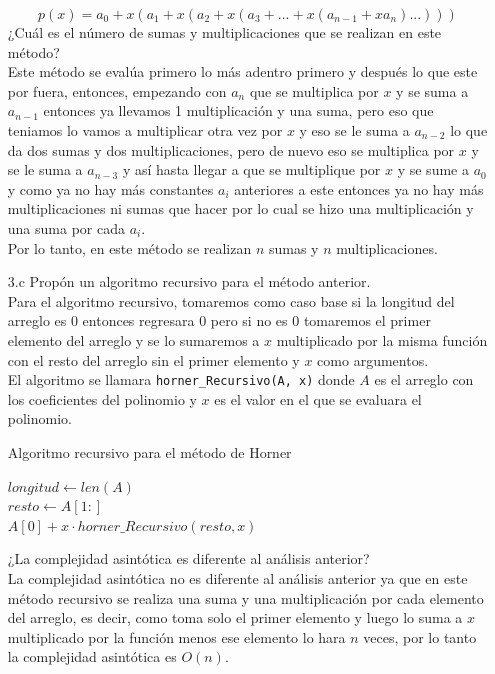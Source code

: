 \documentclass[12pt]{article}
\begin{document}
\begin{itemize}
    \[
        p(x) = a_0 + x(a_1 + x(a_2 + x(a_3 + . . . + x(a_{n-1} + xa_n). . .)))
    \]
    ¿Cuál es el número de sumas y multiplicaciones que se realizan en este método?\\
    Este método se evalúa primero lo más adentro primero y después lo que este por fuera, entonces, empezando con $a_n$ que se multiplica por $x$ y se suma a $a_{n-1}$ entonces ya llevamos 1 multiplicación y una suma, pero eso que teniamos lo vamos a multiplicar otra vez por $x$ y eso se le suma a $a_{n-2}$ lo que da dos sumas y dos multiplicaciones, pero de nuevo eso se multiplica por $x$ y se le suma a $a_{n-3}$ y así hasta llegar a que se multiplique por $x$ y se sume a $a_0$ y como ya no hay más constantes $a_i$ anteriores a este entonces ya no hay más multiplicaciones ni sumas que hacer por lo cual se hizo una multiplicación y  una suma por cada $a_i$.\\
    Por lo tanto, en este método se realizan $n$ sumas y $n$ multiplicaciones.
    \item[3.c] Propón un algoritmo recursivo para el método anterior.\\
    Para el algoritmo recursivo, tomaremos como caso base si la longitud del arreglo es $0$ entonces regresara $0$ pero si no es $0$ tomaremos el primer elemento del arreglo y se lo sumaremos a $x$ multiplicado por la misma función con el resto del arreglo sin el primer elemento y $x$ como argumentos.\\
    El algoritmo se llamara \texttt{horner\_Recursivo(A, x)} donde $A$ es el arreglo con los coeficientes del polinomio y $x$ es el valor en el que se evaluara el polinomio.\\
    \begin{algorithm}[H]
        \caption{Algoritmo recursivo para el método de Horner}
        $longitud \gets len(A)$\\
        $resto \gets A[1:]$\\
        \Return $A[0] + x \cdot horner\_Recursivo(resto, x)$
    \end{algorithm}
    ¿La complejidad asintótica es diferente al análisis anterior?\\
    La complejidad asintótica no es diferente al análisis anterior ya que en este método recursivo se realiza una suma y una multiplicación por cada elemento del arreglo, es decir, como toma solo el primer elemento y luego lo suma a $x$ multiplicado por la función menos ese elemento lo hara $n$ veces, por lo tanto la complejidad asintótica es $O(n)$.\\

\end{itemize}
\end{document}
